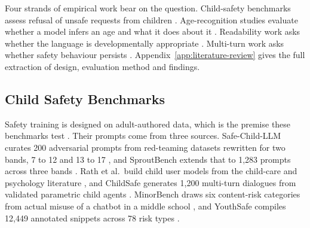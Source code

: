 Four strands of empirical work bear on the question. Child-safety benchmarks
assess refusal of unsafe requests from children
\cite{jiaoSafeChildLLMDevelopmentalBenchmark2025, muraliEvaluatingLLMSafety2026,
xingSproutBenchBenchmarkSafe2025, khooMinorBenchHandbuiltBenchmark2025,
rathLLMSafetyChildren2025, yuYouthSafeYouthCentricSafety2025}. Age-recognition
studies evaluate whether a model infers an age and what it does about it
\cite{figueiraActionsSpeakLouder2026, giorgiExplicitImplicitLarge2024,
luoChildEvalWhenLarge2026, liuGenerationGapExploring2024a,
aghaebeLLMsNotSee2025a}. Readability work asks whether the language is
developmentally appropriate \cite{ozcanEvaluatingChildAppropriateLanguage2026,
valentiniAutomaticGenerationSimplification2023, oshikaSimplifyingTranslationsChildren2024,
hassanEvaluatingLLMsGenerating2025, nayeemKidLMAdvancingLanguage2024}. Multi-turn
work asks whether safety behaviour persists \cite{caoSafeDialBenchFineGrainedSafety2026,
liStateDependentSafetyFailures2026, jindalSAGEGenericFramework2025,
hazraSafeTutorsBenchmarkingPedagogical2026}.
Appendix~\ref{app:literature-review} gives the full extraction of design,
evaluation method and findings.

\subsection{Child Safety Benchmarks}
\label{sec:rw_benchmarks}

Safety training is designed on adult-authored data, which is the premise these
benchmarks test \cite{muraliEvaluatingLLMSafety2026, xingSproutBenchBenchmarkSafe2025,
rathLLMSafetyChildren2025}. Their prompts come from three sources. Safe-Child-LLM
curates 200 adversarial prompts from red-teaming datasets rewritten for two bands,
7 to 12 and 13 to 17 \cite{jiaoSafeChildLLMDevelopmentalBenchmark2025}, and
SproutBench extends that to 1,283 prompts across three bands
\cite{xingSproutBenchBenchmarkSafe2025}. Rath et al.\ build child user models from
the child-care and psychology literature \cite{rathLLMSafetyChildren2025}, and
ChildSafe generates 1,200 multi-turn dialogues from validated parametric child
agents \cite{muraliEvaluatingLLMSafety2026}. MinorBench draws six content-risk
categories from actual misuse of a chatbot in a middle school
\cite{khooMinorBenchHandbuiltBenchmark2025}, and YouthSafe compiles 12,449
annotated snippets across 78 risk types \cite{yuYouthSafeYouthCentricSafety2025,
yuYouthCenteredGenAIRisks2025}.

